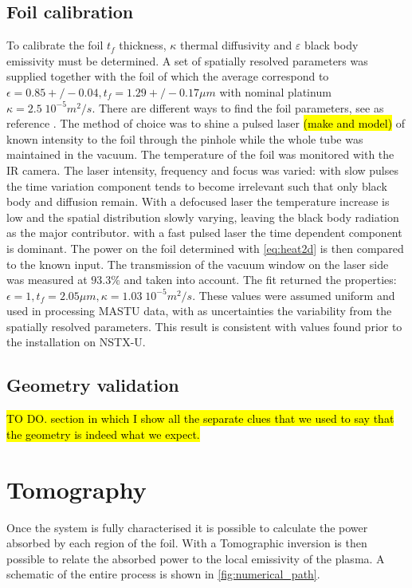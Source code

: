 \subsection{Foil calibration}
To calibrate the foil $t_f$ thickness, $\kappa$ thermal diffusivity and $\varepsilon$ black body emissivity must be determined. A set of spatially resolved parameters was supplied together with the foil of which the average correspond to $\epsilon=0.85+/-0.04, t_f=1.29+/-0.17 \mu m$ with nominal platinum $\kappa=2.5\;10^{-5}m^2/s$. There are different ways to find the foil parameters, see as reference \cite{Itomi2014,Cernuschi2001,Mukai2016}. The method of choice was to shine a pulsed laser \hl{(make and model)} of known intensity to the foil through the pinhole while the whole tube was maintained in the vacuum. The temperature of the foil was monitored with the IR camera. The laser intensity, frequency and focus was varied: with slow pulses the time variation component tends to become irrelevant such that only black body and diffusion remain. With a defocused laser the temperature increase is low and the spatial distribution slowly varying, leaving the black body radiation as the major contributor. with a fast pulsed laser the time dependent component is dominant. The power on the foil determined with \autoref{eq:heat2d} is then compared to the known input. The transmission of the vacuum window on the laser side was measured at $93.3\%$ and taken into account. The fit returned the properties: $\epsilon=1, t_f=2.05 \mu m, \kappa=1.03\;10^{-5}m^2/s$. These values were assumed uniform and used in processing MASTU data, with as uncertainties the variability from the spatially resolved parameters. This result is consistent with values found prior to the installation on NSTX-U. \cite{Reinke2018}

\subsection{Geometry validation}

\hl{TO DO. section in which I show all the separate clues that we used to say that the geometry is indeed what we expect.}

\section{Tomography}
Once the system is fully characterised it is possible to calculate the power absorbed by each region of the foil. With a Tomographic inversion is then possible to relate the absorbed power to the local emissivity of the plasma. A schematic of the entire process is shown in \autoref{fig:numerical_path}.

